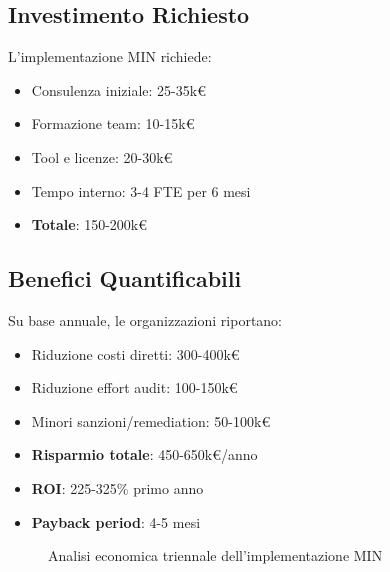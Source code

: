 \subsection{Investimento Richiesto}

L'implementazione MIN richiede:
\begin{itemize}
\item Consulenza iniziale: 25-35k€
\item Formazione team: 10-15k€
\item Tool e licenze: 20-30k€
\item Tempo interno: 3-4 FTE per 6 mesi
\item \textbf{Totale}: 150-200k€
\end{itemize}

\subsection{Benefici Quantificabili}

Su base annuale, le organizzazioni riportano:
\begin{itemize}
\item Riduzione costi diretti: 300-400k€
\item Riduzione effort audit: 100-150k€
\item Minori sanzioni/remediation: 50-100k€
\item \textbf{Risparmio totale}: 450-650k€/anno
\item \textbf{ROI}: 225-325\% primo anno
\item \textbf{Payback period}: 4-5 mesi
\end{itemize}

\begin{figure}[h]
\centering
{}
\caption{Analisi economica triennale dell'implementazione MIN}
\end{figure}

